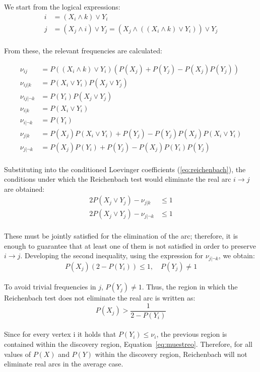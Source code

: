 \documentclass[12pt,a4paper]{report}
\begin{document}
We start from the logical expressions:
\begin{align}
i &= (X_i \land k) \lor Y_i \\
\label{eq:ij}
j &= (X_j \land i) \lor Y_j = (X_j \land ((X_i \land k) \lor Y_i)) \lor Y_j
\end{align}
\\
From these, the relevant frequencies are calculated:

\begin{align*}
\nu_{ij} &= P((X_i \land k) \lor Y_i) (P(X_j) + P(Y_j) - P(X_j)P(Y_j))\\
\nu_{ij|k} &= P(X_i \lor Y_i) P(X_j \lor Y_j) \\
\nu_{ij|\neg k} &= P(Y_i) P(X_j \lor Y_j) \\
\nu_{i|k} &= P(X_i \lor Y_i) \\
\nu_{i|\neg k} &= P(Y_i) \\
\nu_{j|k} &= P(X_j)P(X_i \lor Y_i) + P(Y_j) - P(Y_j)P(X_j)P(X_i \lor Y_i) \\
\nu_{j|\neg k} &= P(X_j)P(Y_i) + P(Y_j) - P(X_j) P(Y_i) P(Y_j)
\end{align*}
\\
Substituting into the conditioned Loevinger coefficients (\ref{eq:reichenbach}), the conditions under which the Reichenbach test would eliminate the real arc $i \to j$ are obtained:
\begin{align}
2 P(X_j \lor Y_j) -\nu_{j|k} &\leq 1 \\
2 P(X_j \lor Y_j) -\nu_{j| \neg k} &\leq 1
\end{align}
\\
These must be jointly satisfied for the elimination of the arc; therefore, it is enough to guarantee that at least one of them is not satisfied in order to preserve $i \to j$. Developing the second inequality, using the expression for $\nu_{j| \neg k}$, we obtain:
\begin{equation}
\label{eq:region}
P(X_j)(2 - P(Y_i)) \leq 1, \quad P(Y_j) \neq 1
\end{equation}
\\
To avoid trivial frequencies in $j$, $P(Y_j) \neq 1$. Thus, the region in which the Reichenbach test does not eliminate the real arc is written as: 
\begin{equation}
\label{eq:muestreo}
P(X_j) > \frac{1}{2 - P(Y_i)}
\end{equation}
\\
Since for every vertex i it holds that $P(Y_i) \leq \nu_i$, the previous region is contained within the discovery region, Equation~\ref{eq:muestreo}. Therefore, for all values of \( P(X) \) and \( P(Y) \) within the discovery region, Reichenbach will not eliminate real arcs in the average case.
\end{document}
